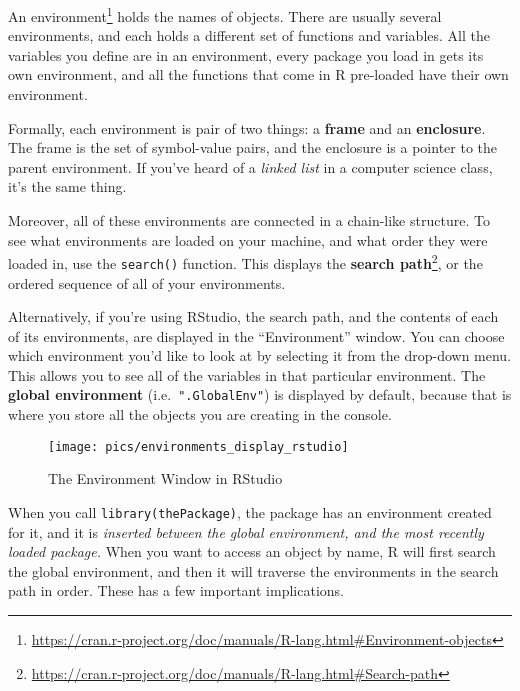 \documentclass[
  12pt,
  krantz2]{krantz}
\renewcommand{\href}[2]{#2\footnote{\url{#1}}}
\begin{document}
An \href{https://cran.r-project.org/doc/manuals/R-lang.html\#Environment-objects}{environment} holds the names of objects. There are usually several environments, and each holds a different set of functions and variables. All the variables you define are in an environment, every package you load in gets its own environment, and all the functions that come in R pre-loaded have their own environment.

\begin{rmd-details}
Formally, each environment is pair of two things: a \textbf{frame} and an \textbf{enclosure}. The frame is the set of symbol-value pairs, and the enclosure is a pointer to the parent environment. If you've heard of a \emph{linked list} in a computer science class, it's the same thing.

\end{rmd-details}

Moreover, all of these environments are connected in a chain-like structure. To see what environments are loaded on your machine, and what order they were loaded in, use the \texttt{search()} function. This displays the \href{https://cran.r-project.org/doc/manuals/R-lang.html\#Search-path}{\textbf{search path}}, or the ordered sequence of all of your environments.

Alternatively, if you're using RStudio, the search path, and the contents of each of its environments, are displayed in the ``Environment'' window. You can choose which environment you'd like to look at by selecting it from the drop-down menu. This allows you to see all of the variables in that particular environment. The \textbf{global environment} (i.e.~\texttt{".GlobalEnv"}) is displayed by default, because that is where you store all the objects you are creating in the console.

\begin{figure}

{\centering \texttt{[image: pics/environments\_display\_rstudio]} 

}

\caption{The Environment Window in RStudio}\label{fig:rstudiodisp}
\end{figure}

When you call \texttt{library(thePackage)}, the package has an environment created for it, and it is \emph{inserted between the global environment, and the most recently loaded package.} When you want to access an object by name, R will first search the global environment, and then it will traverse the environments in the search path in order. These has a few important implications.
\end{document}
